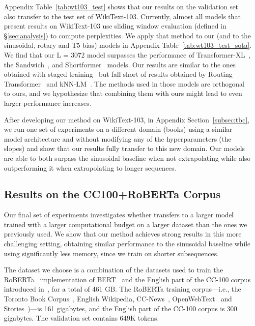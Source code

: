 Appendix Table~\ref{tab:wt103_test} shows that our results on the validation set also transfer to the test set of WikiText-103.
Currently, almost all models that present results on WikiText-103 use sliding window evaluation  (defined in \S\ref{sec:analysis}) to compute perplexities. We apply that method to our (and to the sinusoidal, rotary and T5 bias) models in Appendix Table~\ref{tab:wt103_test_sota}. We find that our L = 3072 model surpasses the performance of Transformer-XL~\citep{transformer-xl}, the Sandwich~\citep{sandwich}, and Shortformer~\citep{shortformer} models. Our results are similar to the ones obtained with staged training~\citep{shortformer} but fall short of results obtained by Routing Transformer~\citep{roy2020efficient} and kNN-LM~\citep{khandelwal20generalization}. The methods used in those models are orthogonal to ours, and we hypothesize that combining them with ours might lead to even larger performance increases. 

After developing our method on WikiText-103, in Appendix Section~\ref{subsec:tbc}, we run one set of experiments on a  different domain (books) using a similar model architecture and without modifying any of the \al hyperparameters (the slopes) and show that our results fully transfer to this new domain. Our models are able to both surpass the sinusoidal baseline when not extrapolating while also outperforming it when extrapolating to longer sequences. 

\subsection{Results on the CC100+RoBERTa Corpus}

Our final set of experiments investigates whether \al transfers to a larger model trained with a larger computational budget on a larger dataset than the ones we previously used. We show that our method achieves strong results in this more challenging setting, obtaining similar performance to the sinusoidal baseline while using significantly less memory, since we train on shorter subsequences. 

The dataset we choose is a combination of the datasets used to train the RoBERTa~\citep{roberta} implementation of BERT~\citep{bert} and the English part of the CC-100 corpus introduced in~\cite{cc-100}, for a total of 461 GB. The RoBERTa training corpus---i.e., the Toronto Book Corpus~\citep{zhu2015aligning}, English Wikipedia, CC-News~\citep{ccnews}, OpenWebText~\citep{openwebtext} and Stories~\citep{stories})---is 161 gigabytes, and the English part of the CC-100 corpus is 300 gigabytes. 
The validation set contains 649K tokens.

